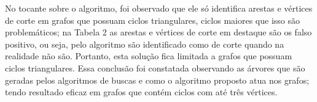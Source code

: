 \documentclass[
	article,
	12pt,
	openright,
	oneside,
	a4paper,
	english,
	french,
	spanish,
	brazil
	]{abntex2}
\begin{document}
No tocante sobre o algoritmo, foi observado que ele só identifica arestas e vértices de corte em grafos que possuam ciclos triangulares, ciclos maiores que isso são problemáticos; na Tabela 2 as arestas e vértices de corte em destaque são os falso positivo, ou seja, pelo algoritmo são identificado como de corte quando na realidade não são. Portanto, esta solução fica limitada a grafos que possuam ciclos triangulares. Essa conclusão foi constatada observando as árvores que são geradas pelos algoritmos de buscas e como o algoritmo proposto atua nos grafos;  tendo resultado eficaz em grafos que contém ciclos com até três vértices.

\end{document}
